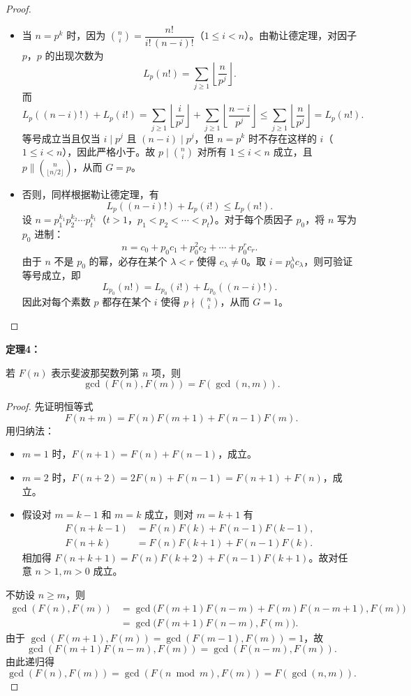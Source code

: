 \begin{proof}\leavevmode

\begin{itemize}
\item 当 $n = p^k$ 时，因为 $\binom{n}{i} = \dfrac{n!}{i!\,(n-i)!}$（$1 \le i < n$）。由勒让德定理，对因子 $p$，$p$ 的出现次数为
\[
L_p(n!) = \sum_{j \ge 1}\left\lfloor\frac{n}{p^j}\right\rfloor.
\]
而
\[
L_p((n-i)!) + L_p(i!) = \sum_{j \ge 1}\left\lfloor\frac{i}{p^j}\right\rfloor + \sum_{j \ge 1}\left\lfloor\frac{n-i}{p^j}\right\rfloor
\le \sum_{j \ge 1}\left\lfloor\frac{n}{p^j}\right\rfloor = L_p(n!).
\]
等号成立当且仅当 $i \mid p^j$ 且 $(n-i) \mid p^j$，但 $n = p^k$ 时不存在这样的 $i$（$1 \le i < n$），因此严格小于。故 $p \mid \binom{n}{i}$ 对所有 $1 \le i < n$ 成立，且 $p \parallel \binom{n}{\lfloor n/2\rfloor}$，从而 $G = p$。

\item 否则，同样根据勒让德定理，有
\[
L_p((n-i)!) + L_p(i!) \le L_p(n!).
\]
设 $n = p_1^{k_1}p_2^{k_2}\cdots p_t^{k_t}$（$t>1$，$p_1<p_2<\cdots<p_t$）。对于每个质因子 $p_0$，将 $n$ 写为 $p_0$ 进制：
\[
n = c_0 + p_0c_1 + p_0^2c_2 + \cdots + p_0^r c_r.
\]
由于 $n$ 不是 $p_0$ 的幂，必存在某个 $\lambda < r$ 使得 $c_\lambda \neq 0$。取 $i = p_0^\lambda c_\lambda$，则可验证等号成立，即
\[
L_{p_0}(n!) = L_{p_0}(i!) + L_{p_0}((n-i)!).
\]
因此对每个素数 $p$ 都存在某个 $i$ 使得 $p \nmid \binom{n}{i}$，从而 $G = 1$。
\end{itemize}

\end{proof}

\textbf{定理4：}

若 $F(n)$ 表示斐波那契数列第 $n$ 项，则
\[
\gcd(F(n), F(m)) = F(\gcd(n, m)).
\]

\begin{proof}\leavevmode

先证明恒等式
\[
F(n+m) = F(n)F(m+1) + F(n-1)F(m).
\]
用归纳法：
\begin{itemize}
\item $m=1$ 时，$F(n+1)=F(n)+F(n-1)$，成立。
\item $m=2$ 时，$F(n+2)=2F(n)+F(n-1)=F(n+1)+F(n)$，成立。
\item 假设对 $m=k-1$ 和 $m=k$ 成立，则对 $m=k+1$ 有
\[
\begin{aligned}
F(n+k-1) &= F(n)F(k) + F(n-1)F(k-1),\\
F(n+k) &= F(n)F(k+1) + F(n-1)F(k).
\end{aligned}
\]
相加得 $F(n+k+1)=F(n)F(k+2)+F(n-1)F(k+1)$。故对任意 $n>1,m>0$ 成立。
\end{itemize}
不妨设 $n \ge m$，则
\[
\begin{aligned}
\gcd(F(n),F(m)) &= \gcd\bigl(F(m+1)F(n-m)+F(m)F(n-m+1),F(m)\bigr)\\
&= \gcd\bigl(F(m+1)F(n-m),F(m)\bigr).
\end{aligned}
\]
由于 $\gcd(F(m+1),F(m)) = \gcd(F(m-1),F(m)) = 1$，故
\[
\gcd(F(m+1)F(n-m),F(m)) = \gcd(F(n-m),F(m)).
\]
由此递归得
\[
\gcd(F(n),F(m)) = \gcd(F(n \bmod m),F(m)) = F(\gcd(n,m)).
\]

\end{proof}

